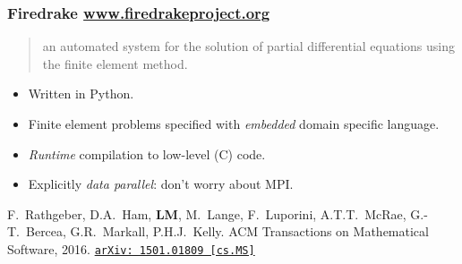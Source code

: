\documentclass[presentation]{beamer}
\newcommand{\arxivlink}[2]{%
  \href{http://www.arxiv.org/abs/#1}%
  {\texttt{arXiv:\,#1\,[#2]}}%
}
\begin{document}
\begin{frame}
  \frametitle{Firedrake \url{www.firedrakeproject.org}}

  \begin{quote}
    {\normalfont [\ldots]} an automated system for the solution of partial
    differential equations using the finite element method.
  \end{quote}

  \begin{itemize}
  \item Written in Python.
  \item Finite element problems specified with \emph{embedded} domain
    specific language.
  \item \emph{Runtime} compilation to low-level (C) code.
  \item Explicitly \emph{data parallel}: don't worry about MPI.
  \end{itemize}

  \begin{flushright}
    {\scriptsize F.~Rathgeber, D.A.~Ham, \textbf{LM}, M.~Lange,
      F.~Luporini, A.T.T.~McRae, G.-T.~Bercea, G.R.~Markall,
      P.H.J.~Kelly. ACM Transactions on Mathematical Software,
      2016. \arxivlink{1501.01809}{cs.MS}}
  \end{flushright}
\end{frame}
\end{document}
